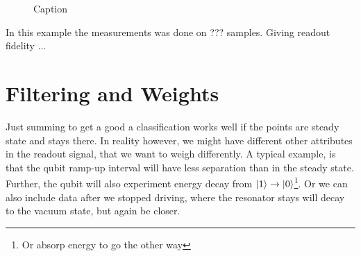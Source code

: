 \begin{figure}
    \centering
    \caption{Caption}
    \label{fig:simple_weights_fidelty}
\end{figure}

In this example the measurements was done on ??? samples. Giving readout fidelity ...  

\section{Filtering and Weights}
Just summing to get a good a classification works well if the points are steady state and stays there. In reality however, we might have different other attributes in the readout signal, that we want to weigh differently. A typical example, is that the qubit ramp-up interval will have less separation than in the steady state. Further, the qubit will also experiment energy decay from $\ket{1}\to \ket{0}$\footnote{Or absorp energy to go the other way}. Or we can also include data after we stopped driving, where the resonator stays will decay to the vacuum state, but again be closer.

